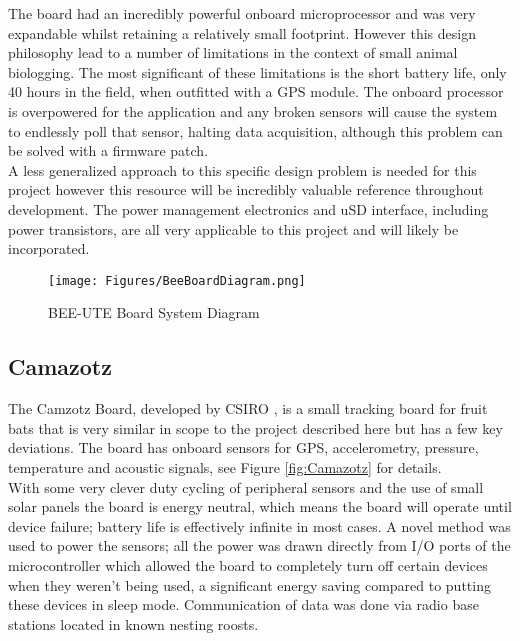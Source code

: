\documentclass[12pt,openany,a4paper]{book}
\begin{document}
			 The board had an incredibly powerful onboard microprocessor and was very expandable whilst retaining a relatively small footprint. However this design philosophy lead to a number of limitations in the context of small animal biologging. The most significant of these limitations is the short battery life, only 40 hours in the field, when outfitted with a GPS module. The onboard processor is overpowered for the application and any broken sensors will cause the system to endlessly poll that sensor, halting data acquisition, although this problem can be solved with a firmware patch. \\
			 
			  A less generalized approach to this specific design problem is needed for this project however this resource will be incredibly valuable reference throughout development. The power management electronics and uSD interface, including power transistors, are all very applicable to this project and will likely be incorporated.
			\begin{figure}[H]
				\centering
				\texttt{[image: Figures/BeeBoardDiagram.png]}
				\caption{BEE-UTE Board System Diagram}
				\label{fig:BEE}
			\end{figure}
			
		\subsection{Camazotz}
			The Camzotz Board, developed by CSIRO \cite{Jurdak13}, is a small tracking board for fruit bats that is very similar in scope to the project described here but has a few key deviations. The board has onboard sensors for GPS, accelerometry, pressure, temperature and acoustic signals, see Figure \ref{fig:Camazotz} for details. \\
			
			With some very clever duty cycling of peripheral sensors and the use of small solar panels the board is energy neutral, which means the board will operate until device failure; battery life is effectively infinite in most cases. A novel method was used to power the sensors; all the power was drawn directly from I/O ports of the microcontroller which allowed the board to completely turn off certain devices when they weren't being used, a significant energy saving compared to putting these devices in sleep mode. Communication of data was done via radio base stations located in known nesting roosts. \\
			
\end{document}
